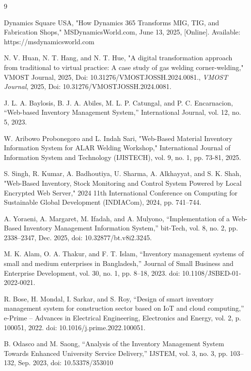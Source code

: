 \documentclass[12pt, letterpaper]{article}
\begin{document}
\newpage

\begin{thebibliography}{9}  

Dynamics Square USA, "How Dynamics 365 Transforms MIG, TIG, and                 Fabrication Shops," MSDynamicsWorld.com, June 13, 2025, [Online]. Available: https://msdynamicsworld.com

N. V. Huan, N. T. Hang, and N. T. Hue, "A digital transformation approach from traditional to virtual practice: A case study of gas welding corner-welding," VMOST Journal, 2025, Doi: 10.31276/VMOSTJOSSH.2024.0081.,
\emph{VMOST Journal}, 2025, Doi: 10.31276/VMOSTJOSSH.2024.0081.

J. L. A. Baylosis, B. J. A. Abiles, M. L. P. Catungal, and P. C. Encarnacion, “Web-based Inventory Management System,” International Journal, vol. 12, no. 5, 2023.

W. Aribowo Probonegoro and L. Indah Sari, "Web-Based Material Inventory Information System for ALAR Welding Workshop," International Journal of Information System and Technology (IJISTECH), vol. 9, no. 1, pp. 73-81, 2025.

S. Singh, R. Kumar, A. Badhoutiya, U. Sharma, A. Alkhayyat, and S. K. Shah, "Web-Based Inventory, Stock Monitoring and Control System Powered by Local Encrypted Web Server," 2024 11th International Conference on Computing for Sustainable Global Development (INDIACom), 2024, pp. 741–744.

A. Yoraeni, A. Margaret, M. Ifadah, and A. Mulyono, “Implementation of a Web-Based Inventory Management Information System,” bit-Tech, vol. 8, no. 2, pp. 2338–2347, Dec. 2025, doi: 10.32877/bt.v8i2.3245.

M. K. Alam, O. A. Thakur, and F. T. Islam, “Inventory management systems of small and medium enterprises in Bangladesh,” Journal of Small Business and Enterprise Development, vol. 30, no. 1, pp. 8–18, 2023. doi: 10.1108/JSBED-01-2022-0021.

R. Bose, H. Mondal, I. Sarkar, and S. Roy, “Design of smart inventory management system for construction sector based on IoT and cloud computing,” e-Prime – Advances in Electrical Engineering, Electronics and Energy, vol. 2, p. 100051, 2022. doi: 10.1016/j.prime.2022.100051.

B. Odasco and M. Saong, “Analysis of the Inventory Management System        Towards Enhanced University Service Delivery,” IJSTEM, vol. 3, no. 3, pp. 103–132, Sep. 2023, doi: 10.53378/353010


\end{thebibliography}
\end{document}
